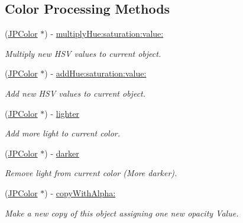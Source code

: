 \subsection*{Color Processing Methods}
\begin{DoxyCompactItemize}
\item 
(\hyperlink{interface_j_p_color}{JPColor} $\ast$) -\/ \hyperlink{interface_j_p_color_a32498959b299b8fbf19c39c00991df60}{multiplyHue:saturation:value:}
\begin{DoxyCompactList}\small\item\em Multiply new HSV values to current object. \item\end{DoxyCompactList}\item 
(\hyperlink{interface_j_p_color}{JPColor} $\ast$) -\/ \hyperlink{interface_j_p_color_a6e09c9e02bc6036074e401e28c14bb57}{addHue:saturation:value:}
\begin{DoxyCompactList}\small\item\em Add new HSV values to current object. \item\end{DoxyCompactList}\item 
(\hyperlink{interface_j_p_color}{JPColor} $\ast$) -\/ \hyperlink{interface_j_p_color_a6ca5307a9f9e8ceb4dd1cd657cf90e25}{lighter}
\begin{DoxyCompactList}\small\item\em Add more light to current color. \item\end{DoxyCompactList}\item 
(\hyperlink{interface_j_p_color}{JPColor} $\ast$) -\/ \hyperlink{interface_j_p_color_ac5769a3a901b96c011d7a33bf54d0fb9}{darker}
\begin{DoxyCompactList}\small\item\em Remove light from current color (More darker). \item\end{DoxyCompactList}\item 
(\hyperlink{interface_j_p_color}{JPColor} $\ast$) -\/ \hyperlink{interface_j_p_color_a3e411517eae8c3d78d567b33a0888160}{copyWithAlpha:}
\begin{DoxyCompactList}\small\item\em Make a new copy of this object assigning one new opacity Value. \item\end{DoxyCompactList}\end{DoxyCompactItemize}
